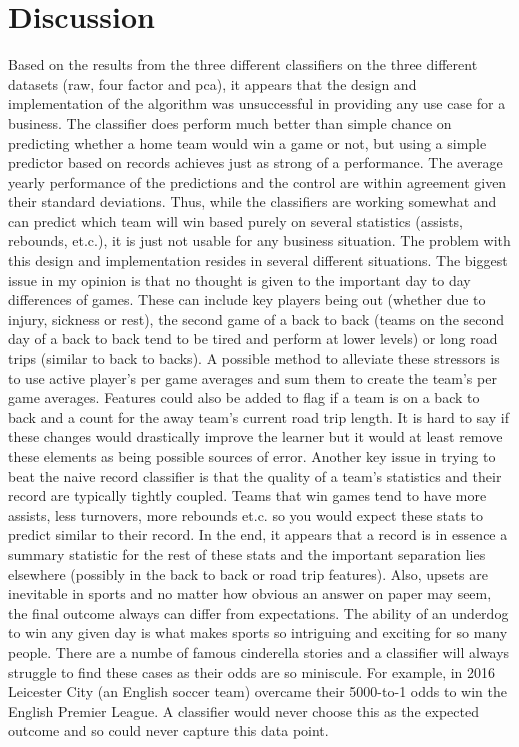 \documentclass[12pt]{article}%
\begin{document}
\section{Discussion}
Based on the results from the three different classifiers on the three different datasets (raw, four factor and pca), it appears that the design and implementation of the algorithm was unsuccessful in providing any use case for a business. The classifier does perform much better than simple chance on predicting whether a home team would win a game or not, but using a simple predictor based on records achieves just as strong of a performance. The average yearly performance of the predictions and the control are within agreement given their standard deviations. Thus, while the classifiers are working somewhat and can predict which team will win based purely on several statistics (assists, rebounds, et.c.), it is just not usable for any business situation.
\newline\newline
The problem with this design and implementation resides in several different situations. The biggest issue in my opinion is that no thought is given to the important day to day differences of games. These can include key players being out (whether due to injury, sickness or rest), the second game of a back to back (teams on the second day of a back to back tend to be tired and perform at lower levels) or long road trips (similar to back to backs). A possible method to alleviate these stressors is to use active player's per game averages and sum them to create the team's per game averages. Features could also be added to flag if a team is on a back to back and a count for the away team's current road trip length. It is hard to say if these changes would drastically improve the learner but it would at least remove these elements as being possible sources of error.
\newline\newline
Another key issue in trying to beat the naive record classifier is that the quality of a team's statistics and their record are typically tightly coupled. Teams that win games tend to have more assists, less turnovers, more rebounds et.c. so you would expect these stats to predict similar to their record. In the end, it appears that a record is in essence a summary statistic for the rest of these stats and the important separation lies elsewhere (possibly in the back to back or road trip features). Also, upsets are inevitable in sports and no matter how obvious an answer on paper may seem, the final outcome always can differ from expectations. The ability of an underdog to win any given day is what makes sports so intriguing and exciting for so many people. There are a numbe of famous cinderella stories and a classifier will always struggle to find these cases as their odds are so miniscule. For example, in 2016 Leicester City (an English soccer team) overcame their 5000-to-1 odds to win the English Premier League. A classifier would never choose this as the expected outcome and so could never capture this data point.
\end{document}
